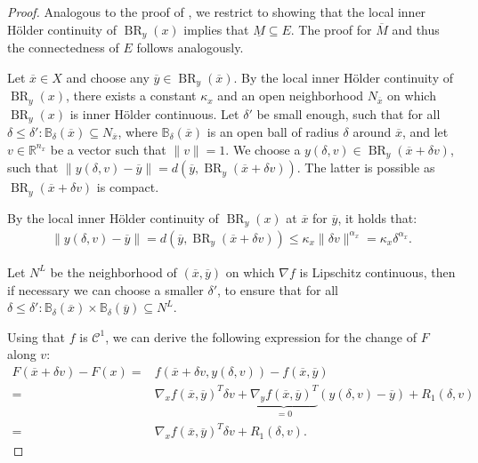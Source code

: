 \documentclass{article}
\newcommand{\R}{\mathbb{R}}
\newcommand{\cC}{\mathcal{C}}
\DeclareMathOperator{\BR}{BR}
\begin{document}
\begin{proof}
    Analogous to the proof of , we restrict to showing that the local inner Hölder continuity of $\BR_y(x)$ implies that $\underline{M} \subseteq E$. The proof for $\overline{M}$ and thus the connectedness of $E$ follows analogously.

    Let $\overline{x}\in X$ and choose any $\overline{y}\in \BR_y(\overline{x})$. By the local inner Hölder continuity of $\BR_y(x)$, there exists a constant $\kappa_x$ and an open neighborhood $N_{\overline{x}}$ on which $\BR_y(x)$ is inner Hölder continuous. Let $\delta'$ be small enough, such that for all $\delta\leq \delta': \mathbb{B}_\delta (\overline{x})\subseteq N_{\overline{x}}$, where $\mathbb{B}_\delta (\overline{x})$ is an open ball of radius $\delta$ around $\overline{x}$, and let $v \in \R^{n_x}$ be a vector such that $\|v\|=1$. We choose a $y(\delta,v) \in \BR_y(\overline{x}+\delta v)$, such that $\|y(\delta,v)-\overline{y}\|=d(\overline{y},\BR_y(\overline{x}+\delta v))$. The latter is possible as $\BR_y(\overline{x}+\delta v)$ is compact.

    By the local inner Hölder continuity of $\BR_y({x})$ at $\overline{x}$ for $\overline{y}$, it holds that:
    \begin{align*}
       \|y(\delta,v)-\overline{y}\| =d(\overline{y},\BR_y(\overline{x}+\delta v)) \leq \kappa_x \|\delta v\|^{\alpha_x} = \kappa_x \delta^{\alpha_x}.
    \end{align*}

    Let $N^L$ be the neighborhood of $(\overline{x},\overline{y})$ on which $\nabla f$ is Lipschitz continuous, then if necessary we can choose a smaller $\delta'$, to ensure that for all $\delta\leq \delta': \mathbb{B}_\delta (\overline{x})\times \mathbb{B}_\delta (\overline{y})\subseteq N^L$. 
    

    Using that $f$ is $\cC^1$, we can derive the following expression for the change of $F$ along $v$:
    \begin{align*}
        F(\overline{x}+\delta v) - F(x) =& f(\overline{x} +\delta v,y(\delta,v)) - f(\overline{x},\overline{y}) \\
        =& \nabla_x f(\overline{x},\overline{y})^T \delta v + \underbrace{\nabla_y f(\overline{x},\overline{y})^T}_{=0} (y(\delta,v)-\overline{y}) + R_1(\delta,v)\\
        =& \nabla_x f(\overline{x},\overline{y})^T \delta v + R_1(\delta,v).
    \end{align*}


\end{proof}
\end{document}
